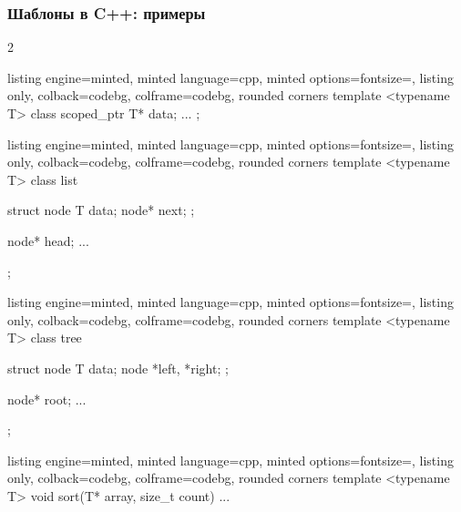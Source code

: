 \documentclass[10pt]{beamer}
\begin{document}
\begin{frame}[fragile]
\frametitle{Шаблоны в C++: примеры}
\begin{itemize}
\begin{multicols}{2}
\begin{tcblisting}{listing engine=minted, minted language=cpp, minted options={fontsize=\scriptsize}, listing only, colback=codebg, colframe=codebg, rounded corners}
template <typename T>
class scoped_ptr {
  T* data;
  ...
};
\end{tcblisting}
\begin{tcblisting}{listing engine=minted, minted language=cpp, minted options={fontsize=\scriptsize}, listing only, colback=codebg, colframe=codebg, rounded corners}
template <typename T>
class list {
  struct node {
    T data;
    node* next;
  };

  node* head;
  ...
};
\end{tcblisting}
\columnbreak
\begin{tcblisting}{listing engine=minted, minted language=cpp, minted options={fontsize=\scriptsize}, listing only, colback=codebg, colframe=codebg, rounded corners}
template <typename T>
class tree {
  struct node {
    T data;
    node *left, *right;
  };

  node* root;
  ...
};
\end{tcblisting}
\begin{tcblisting}{listing engine=minted, minted language=cpp, minted options={fontsize=\scriptsize}, listing only, colback=codebg, colframe=codebg, rounded corners}
template <typename T>
void sort(T* array,
  size_t count) {
  ...
}
\end{tcblisting}
\end{multicols}
\end{itemize}
\end{frame}
\end{document}
